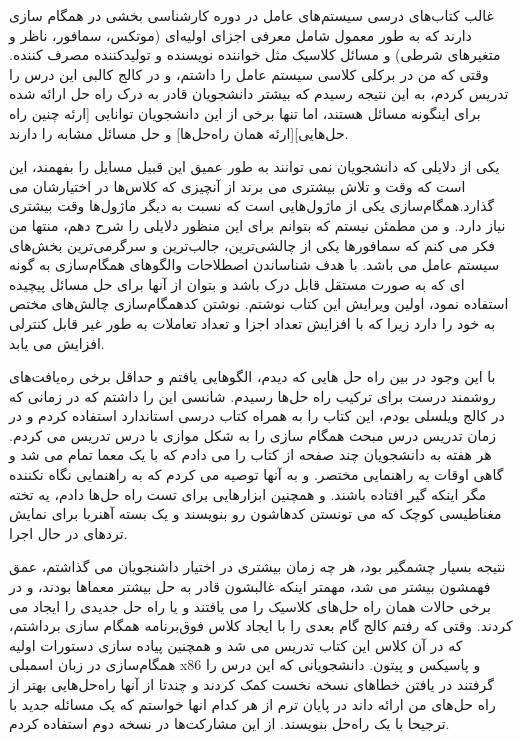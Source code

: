 \documentclass{book}
\begin{document}
غالب کتاب‌های درسی سیستم‌های عامل در دوره کارشناسی بخشی در همگام سازی دارند که به طور معمول شامل معرفی اجزای اولیه‌ای (موتکس، سمافور، ناظر و متغیر‌های شرطی) و مسائل کلاسیک مثل خواننده نویسنده و تولیدکننده مصرف کننده.
وقتی که من در برکلی کلاسی سیستم عامل را داشتم، و در کالج کالبی این درس را تدریس کردم، به این نتیجه رسیدم که بیشتر دانشجویان قادر به درک راه حل ارائه شده برای اینگونه مسائل هستند، اما تنها برخی از این دانشجویان توانایی [ارئه چنین راه حل‌هایی][ارئه همان راه‌حل‌ها] و  حل مسائل مشابه را دارند.

یکی از دلایلی که دانشجویان نمی توانند به طور عمیق این قبیل مسایل را بفهمند، این است که وقت و تلاش بیشتری می برند از آنچیزی که کلاس‌ها در اختیارشان می گذارد.همگام‌سازی یکی از ماژول‌هایی است که نسبت به دیگر ماژول‌ها وقت بیشتری نیاز دارد. و من مطمئن نیستم که بتوانم برای این منظور دلایلی را شرح دهم، منتها من فکر می کنم که سمافور‌ها یکی از چالشی‌ترین، جالب‌ترین و سرگرمی‌ترین بخش‌های سیستم عامل می باشد.
با هدف شناساندن  اصطلاحات والگوهای همگام‌سازی به گونه ای که به صورت مستقل قابل درک باشد و بتوان از آنها برای حل مسائل پیچیده استفاده نمود، اولین ویرایش این کتاب نوشتم.
نوشتن کدهمگام‌سازی چالش‌های مختص به خود را دارد زیرا که با افزایش تعداد اجزا و تعداد تعاملات به طور غیر قابل کنترلی افزایش می یابد.


با این وجود در بین راه حل هایی که دیدم، الگوهایی یافتم و حداقل برخی  ره‌یافت‌های روشمند درست برای ترکیب راه حل‌ها رسیدم.
شانسی این را داشتم که در زمانی که در کالج ویلسلی بودم، این کتاب را به همراه کتاب درسی استاندارد استفاده کردم و در زمان تدریس درس مبحث همگام سازی را به شکل موازی با درس تدریس می کردم. هر هفته به دانشجویان چند صفحه از کتاب را می دادم که با یک معما تمام می شد و گاهی اوقات یه راهنمایی مختصر. و به آنها توصیه می کردم که به راهنمایی نگاه نکننده مگر اینکه گیر افتاده باشند.
و همچنین ابزارهایی برای تست راه حل‌ها دادم، یه تخته مغناطیسی کوچک که می تونستن کدهاشون رو بنویسند و یک بسته آهنربا برای نمایش تردهای در حال اجرا.

نتیجه بسیار چشمگیر بود، هر چه زمان بیشتری در اختیار داشنجویان می گذاشتم، عمق فهمشون بیشتر می شد، مهمتر اینکه غالبشون قادر به حل بیشتر معماها بودند، و در برخی حالات همان راه حل‌های کلاسیک را می یافتند و یا راه حل جدیدی را ایجاد می کردند.
وقتی که رفتم کالج گام بعدی را با ایجاد کلاس فوق‌برنامه همگام سازی برداشتم، که در آن کلاس این کتاب تدریس می شد و همچنین پیاده سازی دستورات اولیه همگام‌سازی در زبان اسمبلی x86 و پاسیکس و پیتون.
دانشجویانی که این درس را گرفتند در یافتن خطاهای نسخه نخست کمک کردند و چندتا از آنها راه‌حل‌هایی بهتر از راه حل‌های من ارائه داند در پایان ترم از هر کدام انها خواستم که یک مسائله جدید با ترجیحا با یک راه‌حل بنویسند. از این مشارکت‌ها در نسخه دوم استفاده کردم.
\end{document}
